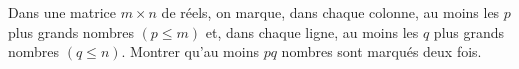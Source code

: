Dans une matrice $m \times n$ de réels, on marque, dans chaque colonne, au moins les $p$ plus grands nombres $(p \leq m)$ et, dans chaque ligne, au moins les $q$ plus grands nombres $(q \leq n)$. Montrer qu'au moins $pq$ nombres sont marqués deux fois.
